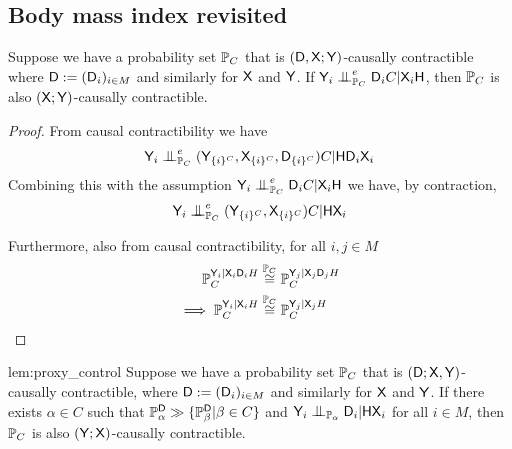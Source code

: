 \subsection{Body mass index revisited}\label{sec:bmi_revis}

\begin{lemma}\label{lem:eci_cc_extend}
Suppose we have a probability set $\mathbb{P}_C$ that is $(\mathsf{D},\mathsf{X};\mathsf{Y})$-causally contractible where $\mathsf{D}:=(\mathsf{D}_i)_{i\in M}$ and similarly for $\mathsf{X}$ and $\mathsf{Y}$. If $\RV{Y}_i\CI^e_{\prob{P}_C} \RV{D}_i C|\RV{X}_i\RV{H}$, then $\mathbb{P}_C$ is also $(\mathsf{X};\mathsf{Y})$-causally contractible.
\end{lemma}

\begin{proof}
From causal contractibility we have
\begin{align}
\RV{Y}_i\CI_{\prob{P}_C}^e (\RV{Y}_{\{i\}^C},\RV{X}_{\{i\}^C},\RV{D}_{\{i\}^C}) C |\RV{H}\RV{D}_i\RV{X}_i
\end{align}
Combining this with the assumption $\RV{Y}_i\CI^e_{\prob{P}_C} \RV{D}_i C|\RV{X}_i\RV{H}$ we have, by contraction,
\begin{align}
    \RV{Y}_i\CI_{\prob{P}_C}^e (\RV{Y}_{\{i\}^C},\RV{X}_{\{i\}^C}) C |\RV{H}\RV{X}_i
\end{align}

Furthermore, also from causal contractibility, for all $i,j\in M$
\begin{align}
    \mathbb{P}_C^{\mathsf{Y}_i|\mathsf{X}_i\mathsf{D}_iH} &\overset{\mathbb{P}_C}{\cong} \mathbb{P}_C^{\mathsf{Y}_j|\mathsf{X}_j\mathsf{D}_jH}\\
    \implies \mathbb{P}_C^{\mathsf{Y}_i|\mathsf{X}_iH} &\overset{\mathbb{P}_C}{\cong} \mathbb{P}_C^{\mathsf{Y}_j|\mathsf{X}_jH}
\end{align}
\end{proof}

\begin{reptheorem}{lem:proxy_control}
Suppose we have a probability set $\mathbb{P}_C$ that is $(\mathsf{D};\mathsf{X},\mathsf{Y})$-causally contractible, where $\mathsf{D}:=(\mathsf{D}_i)_{i\in M}$ and similarly for $\mathsf{X}$ and $\mathsf{Y}$. If there exists $\alpha\in C$ such that $\mathbb{P}_\alpha^{\mathsf{D}}\gg \{\mathbb{P}_\beta^{\mathsf{D}}|\beta\in C\}$ and $\RV{Y}_i\CI_{\prob{P}_\alpha} \RV{D}_i|\RV{HX}_i$ for all $i\in M$, then $\mathbb{P}_C$ is also $(\mathsf{Y};\mathsf{X})$-causally contractible.
\end{reptheorem}

